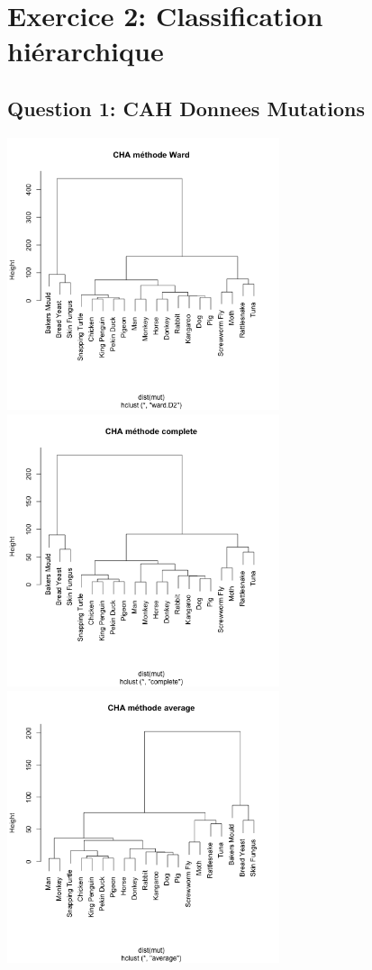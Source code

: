 \documentclass[10pt]{article}
\begin{document}
	\section{ Exercice 2: Classification hiérarchique}
	\subsection{Question 1: CAH Donnees Mutations}
	\includegraphics[height = 8cm, width = 8cm]{Figures/HClust/hclust_Mutations_ward.png}
	\includegraphics[height = 8cm, width = 8cm]{Figures/HClust/hclust_Mutations_cplt.png}\\
	\includegraphics[height = 8cm, width = 8cm]{Figures/HClust/hclust_Mutations_avg.png}
\end{document}
